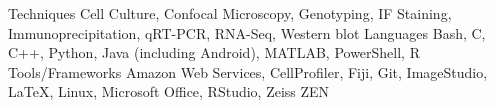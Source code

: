 \begin{cvskills}
  \cvskill
    {Techniques} %
    {Cell Culture, Confocal Microscopy, Genotyping, IF Staining, Immunoprecipitation, qRT-PCR, RNA-Seq, Western blot} %
  \cvskill
    {Languages} %
    {Bash, C, C++, Python, Java (including Android), MATLAB, PowerShell, R} %
  \cvskill
    {Tools/Frameworks} %
    {Amazon Web Services, CellProfiler, Fiji, Git, ImageStudio, LaTeX, Linux, Microsoft Office, RStudio, Zeiss ZEN} %
\end{cvskills}
